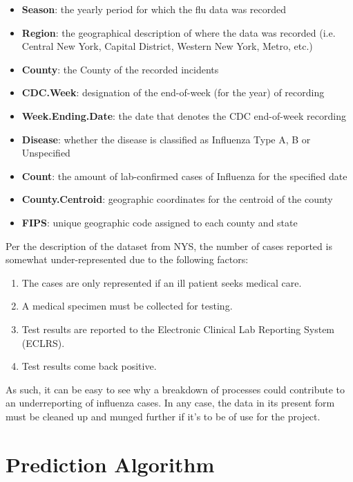 \documentclass[12pt]{article}
\begin{document}
\begin{itemize}
	\item {\textbf{Season}: the yearly period for which the flu data was recorded}
	\item {\textbf{Region}: the geographical description of where the data was recorded (i.e. Central New York, Capital District, Western New York, Metro, etc.)}
	\item {\textbf{County}: the County of the recorded incidents}
	\item {\textbf{CDC.Week}: designation of the end-of-week (for the year) of recording }
	\item {\textbf{Week.Ending.Date}: the date that denotes the CDC end-of-week recording} 
	\item {\textbf{Disease}: whether the disease is classified as Influenza Type A, B or Unspecified} 
	\item {\textbf{Count}: the amount of lab-confirmed cases of Influenza for the specified date}
	\item {\textbf{County.Centroid}: geographic coordinates for the centroid of the county} 
	\item {\textbf{FIPS}: unique geographic code assigned to each county and state} 
\end{itemize}

Per the description of the dataset from NYS, the number of cases reported is somewhat under-represented due to the following factors: 

\begin{enumerate}
	\item The cases are only represented if an ill patient seeks medical care.
	\item A medical specimen must be collected for testing.
	\item Test results are reported to the Electronic Clinical Lab Reporting System (ECLRS).
	\item Test results come back positive. 
\end{enumerate}

As such, it can be easy to see why a breakdown of processes could contribute to an underreporting of influenza cases. In any case, the data in its present form must be cleaned up and munged further if it’s to be of use for the project. 

\section{Prediction Algorithm}
\end{document}
